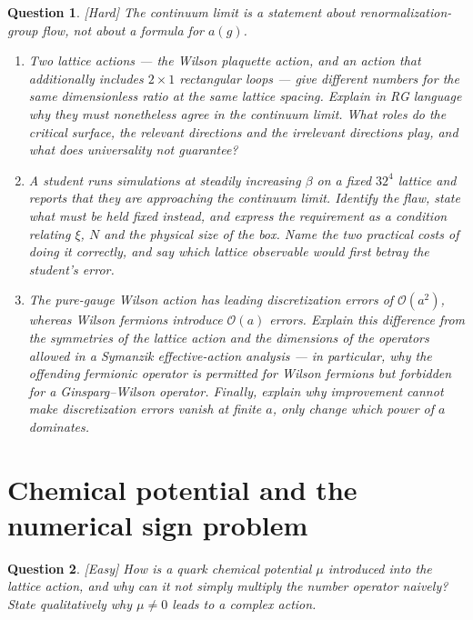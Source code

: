 \documentclass[11pt]{article}
\newcommand{\diff}[1]{\textcolor{blue!60!black}{\footnotesize\textsf{[#1]}}\quad}
\newtheorem{question}{Question}
\begin{document}
\begin{question}
\diff{Hard} The continuum limit is a statement about renormalization-group flow, not about a formula for $a(g)$.
\begin{enumerate}[label=(\roman*), leftmargin=*]
  \item Two lattice actions --- the Wilson plaquette action, and an action that additionally includes $2\times 1$ rectangular loops --- give \emph{different} numbers for the same dimensionless ratio at the same lattice spacing. Explain in RG language why they must nonetheless agree in the continuum limit. What roles do the critical surface, the relevant directions and the irrelevant directions play, and what does universality \emph{not} guarantee?
  \item A student runs simulations at steadily increasing $\beta$ on a fixed $32^4$ lattice and reports that they are approaching the continuum limit. Identify the flaw, state what must be held fixed instead, and express the requirement as a condition relating $\xi$, $N$ and the physical size of the box. Name the two practical costs of doing it correctly, and say which lattice observable would first betray the student's error.
  \item The pure-gauge Wilson action has leading discretization errors of $\mathcal{O}(a^2)$, whereas Wilson fermions introduce $\mathcal{O}(a)$ errors. Explain this difference from the symmetries of the lattice action and the dimensions of the operators allowed in a Symanzik effective-action analysis --- in particular, why the offending fermionic operator is permitted for Wilson fermions but forbidden for a Ginsparg--Wilson operator. Finally, explain why improvement cannot make discretization errors vanish at finite $a$, only change which power of $a$ dominates.
\end{enumerate}
\end{question}

\section{Chemical potential and the numerical sign problem}

\begin{question}
\diff{Easy} How is a quark chemical potential $\mu$ introduced into the lattice action, and why can it not simply multiply the number operator naively? State qualitatively why $\mu \neq 0$ leads to a complex action.
\end{question}
\end{document}
